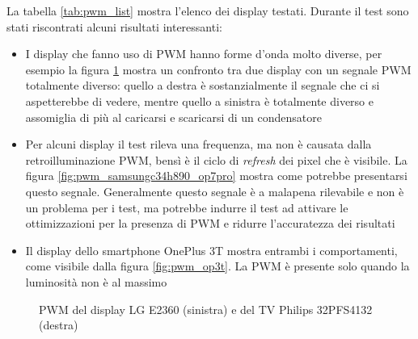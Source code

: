 La tabella \ref{tab:pwm_list} mostra l'elenco dei display testati. Durante il test sono stati riscontrati alcuni risultati interessanti:\begin{itemize}
	\item I display che fanno uso di PWM hanno forme d'onda molto diverse, per esempio la figura \ref{fig:pwm_lge2360_philips32pfs4132} mostra un confronto tra due display con un segnale PWM totalmente diverso: quello a destra è sostanzialmente il segnale che ci si aspetterebbe di vedere, mentre quello a sinistra è totalmente diverso e assomiglia di più al caricarsi e scaricarsi di un condensatore
	\item Per alcuni display il test rileva una frequenza, ma non è causata dalla retroilluminazione PWM, bensì è il ciclo di \textit{refresh} dei pixel che è visibile. La figura \ref{fig:pwm_samsungc34h890_op7pro} mostra come potrebbe presentarsi questo segnale. Generalmente questo segnale è a malapena rilevabile e non è un problema per i test, ma potrebbe indurre il test ad attivare le ottimizzazioni per la presenza di PWM e ridurre l'accuratezza dei risultati
	\item Il display dello smartphone OnePlus 3T mostra entrambi i comportamenti, come visibile dalla figura \ref{fig:pwm_op3t}. La PWM è presente solo quando la luminosità non è al massimo
\end{itemize}

\begin{figure}[h!]
	\centering
	\caption{PWM del display LG E2360 (sinistra) e del TV Philips 32PFS4132 (destra)}
	\label{fig:pwm_lge2360_philips32pfs4132}
\end{figure}

